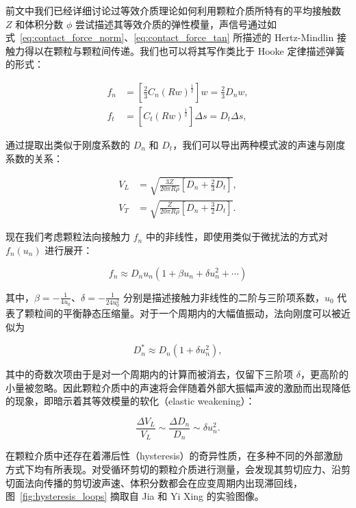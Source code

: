 前文中我们已经详细讨论过等效介质理论如何利用颗粒介质所特有的平均接触数 $Z$ 和体积分数 $\phi$ 尝试描述其等效介质的弹性模量，声信号通过如式~\eqref{eq:contact_force_norm}、\eqref{eq:contact_force_tan} 所描述的 Hertz-Mindlin 接触力得以在颗粒与颗粒间传递。我们也可以将其写作类比于 Hooke 定律描述弹簧的形式：

\begin{align}
  f_{n} &= \left[\frac{2}{3}C_{n}(Rw)^{\frac{1}{2}}\right]w = \frac{2}{3}D_{n}w,\\
  f_{t} &= \left[C_{t}(Rw)^{\frac{1}{2}}\right]\Delta s = D_{t}\Delta s,
\end{align}

通过提取出类似于刚度系数的 $D_{n}$ 和 $D_{t}$，我们可以导出两种模式波的声速与刚度系数的关系\cite{doi.org/10.1029/GL010i011p01073}：

\begin{align}
  V_{L} &= \sqrt{\frac{3Z}{20\pi R\rho}\left[D_{n} + \frac{2}{3}D_{t}\right]},\\
  V_{T} &= \sqrt{\frac{ Z}{20\pi R\rho}\left[D_{n} + \frac{3}{2}D_{t}\right]}.
\end{align}

现在我们考虑颗粒法向接触力 $f_{n}$ 中的非线性，即使用类似于微扰法的方式对 $f_{n}(u_{n})$ 进行展开：

\begin{equation}
  f_{n} \approx D_{n}u_{n}\left(1 + \beta u_{n} + \delta u_{n}^{2} + \cdots\right)
\end{equation}

其中，$\beta = -\frac{1}{4u_{0}}$、$\delta = -\frac{1}{24u_{0}^{2}}$ 分别是描述接触力非线性的二阶与三阶项系数，$u_{0}$ 代表了颗粒间的平衡静态压缩量。对于一个周期内的大幅值振动，法向刚度可以被近似为

\begin{equation}
  D_{n}^{*} \approx D_{n}(1 + \delta u_{n}^{2}),
\end{equation}

其中的奇数次项由于是对一个周期内的计算而被消去，仅留下三阶项 $\delta$，更高阶的小量被忽略。因此颗粒介质中的声速将会伴随着外部大振幅声波的激励而出现降低的现象，即暗示着其等效模量的软化（elastic weakening）\cite{PhysRevE.84.020301}：

\begin{equation}
  \frac{\Delta V_{L}}{V_{L}} \sim \frac{\Delta D_{n}}{D_{n}}\sim \delta u_{n}^{2}.
\end{equation}

在颗粒介质中还存在着滞后性（hysteresis）的奇异性质，在多种不同的外部激励方式下均有所表现。对受循环剪切的颗粒介质进行测量，会发现其剪切应力、沿剪切面法向传播的剪切波声速、体积分数都会在应变周期内出现滞回线\cite{PhysRevE.85.051302,PhysRevLett.126.048002}，图~\ref{fig:hysteresis_loops} 摘取自 Jia 和 Yi Xing 的实验图像。


